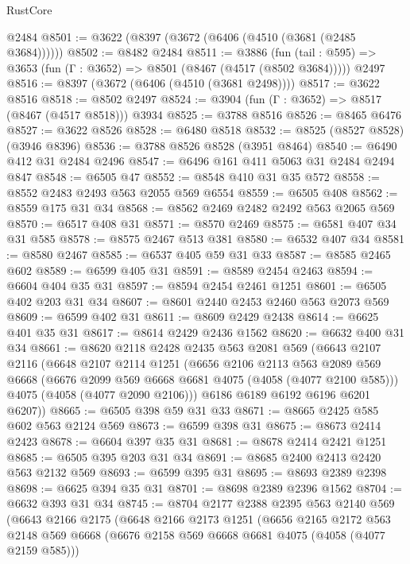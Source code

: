 \begin{lexlean}{RustCore}
\begin{coremodule}
    @2484
@8501 := @3622 (@8397 (@3672 (@6406 (@4510 (@3681 (@2485 @3684))))))
@8502 := @8482 @2484
@8511 := @3886
    (fun (tail : @595) => @3653 (fun (Γ : @3652) => @8501 (@8467 (@4517 (@8502 @3684)))))
    @2497
@8516 := @8397 (@3672 (@6406 (@4510 (@3681 @2498))))
@8517 := @3622 @8516
@8518 := @8502 @2497
@8524 := @3904 (fun (Γ : @3652) => @8517 (@8467 (@4517 @8518))) @3934
@8525 := @3788 @8516
@8526 := @8465 @6476
@8527 := @3622 @8526
@8528 := @6480 @8518
@8532 := @8525 (@8527 @8528) (@3946 @8396)
@8536 := @3788 @8526 @8528 (@3951 @8464)
@8540 := @6490 @412 @31 @2484 @2496
@8547 := @6496 @161 @411 @5063 @31 @2484 @2494 @847
@8548 := @6505 @47
@8552 := @8548 @410 @31 @35 @572
@8558 := @8552 @2483 @2493 @563 @2055 @569 @6554
@8559 := @6505 @408
@8562 := @8559 @175 @31 @34
@8568 := @8562 @2469 @2482 @2492 @563 @2065 @569
@8570 := @6517 @408 @31
@8571 := @8570 @2469
@8575 := @6581 @407 @34 @31 @585
@8578 := @8575 @2467 @513 @381
@8580 := @6532 @407 @34
@8581 := @8580 @2467
@8585 := @6537 @405 @59 @31 @33
@8587 := @8585 @2465 @602
@8589 := @6599 @405 @31
@8591 := @8589 @2454 @2463
@8594 := @6604 @404 @35 @31
@8597 := @8594 @2454 @2461 @1251
@8601 := @6505 @402 @203 @31 @34
@8607 := @8601 @2440 @2453 @2460 @563 @2073 @569
@8609 := @6599 @402 @31
@8611 := @8609 @2429 @2438
@8614 := @6625 @401 @35 @31
@8617 := @8614 @2429 @2436 @1562
@8620 := @6632 @400 @31 @34
@8661 := @8620
    @2118
    @2428
    @2435
    @563
    @2081
    @569
    (@6643
      @2107
      @2116
      (@6648
        @2107
        @2114
        @1251
        (@6656
          @2106
          @2113
          @563
          @2089
          @569
          @6668
          (@6676 @2099 @569 @6668 @6681 @4075 (@4058 (@4077 @2100 @585)))
          @4075
          (@4058 (@4077 @2090 @2106)))
        @6186
        @6189
        @6192
        @6196
        @6201
        @6207))
@8665 := @6505 @398 @59 @31 @33
@8671 := @8665 @2425 @585 @602 @563 @2124 @569
@8673 := @6599 @398 @31
@8675 := @8673 @2414 @2423
@8678 := @6604 @397 @35 @31
@8681 := @8678 @2414 @2421 @1251
@8685 := @6505 @395 @203 @31 @34
@8691 := @8685 @2400 @2413 @2420 @563 @2132 @569
@8693 := @6599 @395 @31
@8695 := @8693 @2389 @2398
@8698 := @6625 @394 @35 @31
@8701 := @8698 @2389 @2396 @1562
@8704 := @6632 @393 @31 @34
@8745 := @8704
    @2177
    @2388
    @2395
    @563
    @2140
    @569
    (@6643
      @2166
      @2175
      (@6648
        @2166
        @2173
        @1251
        (@6656
          @2165
          @2172
          @563
          @2148
          @569
          @6668
          (@6676 @2158 @569 @6668 @6681 @4075 (@4058 (@4077 @2159 @585)))

\end{coremodule}
\end{lexlean}
